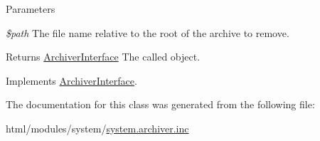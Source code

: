 \begin{DoxyParams}{Parameters}
\item[{\em \$path}]The file name relative to the root of the archive to remove.\end{DoxyParams}
\begin{DoxyReturn}{Returns}
\hyperlink{interfaceArchiverInterface}{ArchiverInterface} The called object. 
\end{DoxyReturn}


Implements \hyperlink{interfaceArchiverInterface_adf87dd4d31b2af7c9a90617436683edc}{ArchiverInterface}.

The documentation for this class was generated from the following file:\begin{DoxyCompactItemize}
\item 
html/modules/system/\hyperlink{system_8archiver_8inc}{system.archiver.inc}\end{DoxyCompactItemize}
